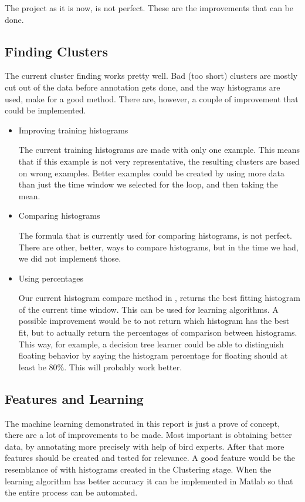 The project as it is now, is not perfect. These are the improvements that can be done.
\subsection{Finding Clusters} 
The current cluster finding works pretty well. Bad (too short) clusters are
mostly cut out of the data before annotation gets done, and the way histograms
are used, make for a good method. There are, however, a couple of improvement
that could be implemented.

\begin{itemize}
 \item Improving training histograms

    The current training histograms are made with only one example. This means
    that if this example is not very representative, the resulting clusters are
    based on wrong examples. Better examples could be created by using more data
    than just the time window we selected for the loop, and then taking the
    mean.
 \item Comparing histograms

    The formula that is currently used for comparing histograms, is not perfect.
    There are other, better, ways to compare histograms, but in the time we had,
    we did not implement those.

 \item Using percentages
    
    Our current histogram compare method in \matlab, returns the best fitting
    histogram of the current time window. This can be 
    used for learning algorithms. A possible improvement would be to not return
    which histogram has the best fit, but to actually return the percentages of
    comparison between histograms. This way, for example, a decision tree
    learner could be able to distinguish floating behavior by saying the
    histogram percentage for floating should at least be 80\%. This will
    probably work better.
\end{itemize}
    

\subsection{Features and Learning}
The machine learning demonstrated in this report is just a prove of concept, there are a lot of improvements to be made. Most important is obtaining better data, by annotating more precisely with help of bird experts. After that more features should be created and tested for relevance. A good feature would be the resemblance of with histograms created in the Clustering stage. When the learning algorithm has better accuracy it can be implemented in Matlab so that the entire process can be automated.